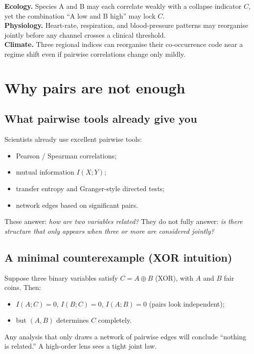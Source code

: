 \documentclass[11pt,a4paper]{article}
\begin{document}
\begin{fieldbox}
\textbf{Ecology.} Species A and B may each correlate weakly with a collapse
indicator $C$, yet the combination ``A low and B high'' may lock $C$.\\
\textbf{Physiology.} Heart-rate, respiration, and blood-pressure patterns
may reorganise jointly before any channel crosses a clinical threshold.\\
\textbf{Climate.} Three regional indices can reorganise their co-occurrence
code near a regime shift even if pairwise correlations change only mildly.
\end{fieldbox}

\section{Why pairs are not enough}
\label{sec:pairs}

\subsection{What pairwise tools already give you}

Scientists already use excellent pairwise tools:
\begin{itemize}[leftmargin=*,itemsep=2pt]
  \item Pearson / Spearman correlations;
  \item mutual information $I(X;Y)$;
  \item transfer entropy and Granger-style directed tests;
  \item network edges based on significant pairs.
\end{itemize}
These answer: \emph{how are two variables related?} They do not fully
answer: \emph{is there structure that only appears when three or more are
considered jointly?}

\subsection{A minimal counterexample (XOR intuition)}

Suppose three binary variables satisfy $C = A \oplus B$ (XOR), with $A$ and
$B$ fair coins. Then:
\begin{itemize}[leftmargin=*,itemsep=2pt]
  \item $I(A;C)=0$, $I(B;C)=0$, $I(A;B)=0$ (pairs look independent);
  \item but $(A,B)$ determines $C$ completely.
\end{itemize}
Any analysis that only draws a network of pairwise edges will conclude
``nothing is related.'' A high-order lens sees a tight joint law.
\end{document}
